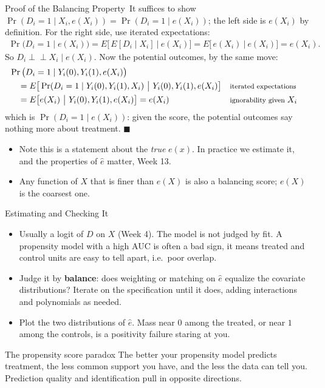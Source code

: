 \documentclass[aspectratio=169,11pt,xcolor=dvipsnames]{beamer}
\newcommand{\indep}{\perp\!\!\!\perp}
\newcommand{\E}{E}
\newcommand{\adv}{\,\raisebox{0.6pt}{\textcolor{accent}{$\bigstar$}}}
\newcommand{\core}{\,\raisebox{0.6pt}{\textcolor{corestar}{$\bigstar$}}}
\begin{document}
\begin{frame}{Proof of the Balancing Property\adv}
It suffices to show $\Pr(D_i = 1 \mid X_i, e(X_i)) = \Pr(D_i=1\mid e(X_i))$; the
left side is $e(X_i)$ by definition. For the right side, use iterated
expectations:
\begin{align*}
  \Pr\big(D_i = 1 \mid e(X_i)\big)
  = \E\big[\, \E[D_i \mid X_i] \ \big|\ e(X_i)\big]
  = \E\big[\, e(X_i)\ \big|\ e(X_i)\big]
  = e(X_i) .
\end{align*}
So $D_i \indep X_i \mid e(X_i)$. Now the potential outcomes, by the same move:
{\small
\begin{align*}
  &\Pr\big(D_i=1 \mid Y_i(0),Y_i(1),e(X_i)\big) \\
  &\quad= \E\big[\Pr(D_i=1\mid Y_i(0),Y_i(1),X_i)\ \big|\ Y_i(0),Y_i(1),e(X_i)\big]
  && \text{\footnotesize iterated expectations} \\
  &\quad= \E\big[e(X_i)\ \big|\ Y_i(0),Y_i(1),e(X_i)\big] = e(X_i)
  && \text{\footnotesize ignorability given } X_i
\end{align*}}
which is $\Pr(D_i=1\mid e(X_i))$: given the score, the potential outcomes say
nothing more about treatment. $\blacksquare$
\vskip2pt
\begin{itemize}\itemsep2pt
  \item Note this is a statement about the \emph{true} $e(x)$. In practice we
        estimate it, and the properties of $\hat e$ matter, Week 13.
  \item Any function of $X$ that is finer than $e(X)$ is also a balancing score;
        $e(X)$ is the coarsest one.
\end{itemize}
\end{frame}

\begin{frame}{Estimating and Checking It\core}
\begin{itemize}\itemsep3pt
  \item Usually a logit of $D$ on $X$ (Week 4). \alert{The model is not judged by
        fit.} A propensity model with a high AUC is often a bad sign, it means
        treated and control units are easy to tell apart, i.e.\ poor overlap.
  \item Judge it by \textbf{balance}: does weighting or matching on $\hat e$
        equalize the covariate distributions? Iterate on the specification until
        it does, adding interactions and polynomials as needed.
  \item Plot the two distributions of $\hat e$. Mass near $0$ among the treated,
        or near $1$ among the controls, is a positivity failure staring at you.
\end{itemize}
\vskip3pt
\begin{alertblock}{The propensity score paradox}
The better your propensity model predicts treatment, the less common support you
have, and the less the data can tell you. Prediction quality and identification
pull in opposite directions.
\end{alertblock}
\end{frame}
\end{document}
